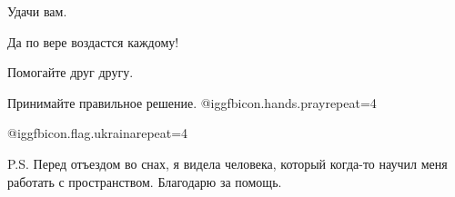 Удачи вам. 

Да по вере воздастся  каждому!

Помогайте друг другу. 

Принимайте правильное решение. @igg{fbicon.hands.pray}{repeat=4} 

@igg{fbicon.flag.ukraina}{repeat=4}

P.S. Перед отъездом во снах, я видела человека, который когда-то научил меня
работать с пространством.  Благодарю за помощь.

